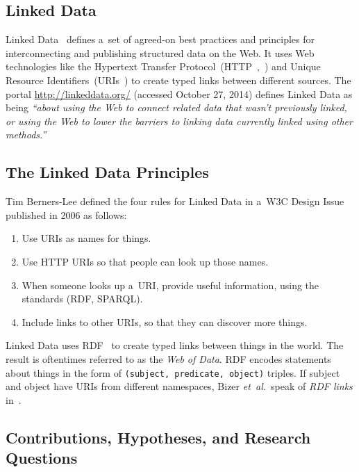 \documentclass[letterpaper]{article}
\begin{document}
\subsection{Linked Data}

Linked Data~\cite{bernerslee2006linkeddata}
defines a~set of agreed-on best practices and
principles for interconnecting and publishing
structured data on the Web.
It uses Web technologies like the Hypertext Transfer Protocol~(HTTP~,~\cite{fielding1999http})
and Unique Resource Identifiers~(URIs~\cite{bernerslee2005uri})
to create typed links between different sources.
The portal \url{http://linkeddata.org/} (accessed October 27, 2014)
defines Linked Data as being
\textit{``about using the Web to connect related data that
wasn't previously linked, or using the Web
to lower the barriers to linking data
currently linked using other methods.''}

\subsection{The Linked Data Principles}

Tim Berners-Lee defined the four rules for Linked Data in a~W3C Design Issue~\cite{bernerslee2006linkeddata}
published in 2006 as follows:

\begin{enumerate}
  \item Use URIs as names for things.
  \item Use HTTP URIs so that people can look up those names.
  \item When someone looks up a~URI, provide useful information,
        using the standards (RDF, SPARQL).
  \item Include links to other URIs,
        so that they can discover more things.
\end{enumerate}

Linked Data uses RDF~\cite{klyne2004rdf} to create
typed links between things in the world.
The result is oftentimes referred to as the \emph{Web of Data}.
RDF encodes statements about things in the form of
\texttt{(subject, predicate, object)} triples.
If subject and object have URIs from different namespaces,
Bizer \emph{et~al.}\ speak of \emph{RDF links}
in~\cite{heath2011linkeddata}.

\subsection{Contributions, Hypotheses, and Research Questions}
\end{document}
